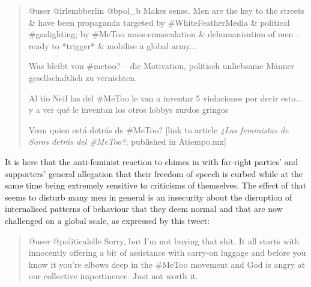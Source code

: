 \documentclass[output=paper,english,spanish,german,english]{langsci/langscibook}
\begin{document}
\begin{quote}\sffamily
  @user @irlembberlin @bpol\_b Makes sense. Men are the key to the streets \& have been propaganda targeted by \#WhiteFeatherMedia \& political \#gaslighting; by \#MeToo mass-emasculation \& dehumanisation of men -- ready to *trigger* \& mobilise a global army...

  \foreignlanguage{german}{Was bleibt von \#metoo? -- die Motivation, politisch unliebsame Männer gesellschaftlich zu vernichten.}

  \foreignlanguage{spanish}{Al tío Neil las del \#MeToo le van a inventar 5 violaciones por decir esto... y a ver qué le inventan los otros lobbys zurdos gringos}

  \foreignlanguage{spanish}{Vean quien está detrás de \#MeToo?} [link to article \textit{¿Las feministas de Soros detrás del \#MeToo?}, published in Atiempo.mx]
\end{quote}

\noindent It is here that the anti-feminist reaction to \mt chimes in with far-right parties' and supporters' general allegation that their freedom of speech is curbed \parencites{lang17}[140--141]{salazar18} while at the same time being extremely sensitive to criticisms of themselves. The effect of \mt that seems to disturb many men in general is an insecurity about the disruption of internalised patterns of behaviour that they deem normal and that are now challenged on a global scale, as expressed by this tweet:

\begin{quote}\sffamily
  @user @politicalelle Sorry, but I'm not buying that shit. It all starts with innocently offering a bit of assistance with carry-on luggage and before you know it you're elbows deep in the \#MeToo movement and God is angry at our collective impertinence. Just not worth it.

\end{quote}
\end{document}
